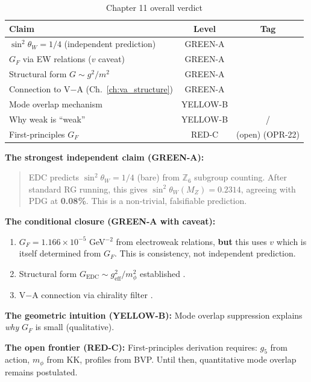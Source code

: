 \begin{table}[ht]
\centering
\caption{Chapter 11 overall verdict}
\label{tab:ch11_verdict}
\begin{tabular}{lcc}
\toprule
\textbf{Claim} & \textbf{Level} & \textbf{Tag} \\
\midrule
$\sin^2\theta_W = 1/4$ (independent prediction) & GREEN-A & \tagDer{} \\
$G_F$ via EW relations ($v$ caveat) & GREEN-A & \tagDc{} \\
Structural form $G \sim g^2/m^2$ & GREEN-A & \tagDc{} \\
Connection to V$-$A (Ch.~\ref{ch:va_structure}) & GREEN-A & \tagDc{} \\
\midrule
Mode overlap mechanism & YELLOW-B & \tagP{} \\
Why weak is ``weak'' & YELLOW-B & \tagP{}/\tagI{} \\
\midrule
First-principles $G_F$ & RED-C & (open) (OPR-22) \\
\bottomrule
\end{tabular}
\end{table}

\begin{tcolorbox}[colback=green!5, colframe=green!50!black,
    title=\textbf{Chapter 11 Summary}]
\textbf{The strongest independent claim (GREEN-A):}
\begin{quote}
EDC predicts $\sin^2\theta_W = 1/4$ (bare) from $\mathbb{Z}_6$ subgroup counting.
After standard RG running, this gives $\sin^2\theta_W(M_Z) = 0.2314$, agreeing
with PDG at \textbf{0.08\%}. This is a non-trivial, falsifiable prediction.
\end{quote}

\textbf{The conditional closure (GREEN-A with caveat):}
\begin{enumerate}[nosep]
    \item $G_F = 1.166 \times 10^{-5}$ GeV$^{-2}$ from electroweak relations,
          \textbf{but} this uses $v$ which is itself determined from $G_F$.
          This is consistency, not independent prediction.
    \item Structural form $G_{\text{EDC}} \sim g_{\text{eff}}^2/m_\phi^2$
          established \tagDc{}.
    \item V$-$A connection via chirality filter \tagDc{}.
\end{enumerate}

\textbf{The geometric intuition (YELLOW-B):}
Mode overlap suppression explains \emph{why} $G_F$ is small (qualitative).

\textbf{The open frontier (RED-C):}
First-principles derivation requires: $g_5$ from action, $m_\phi$ from KK,
profiles from BVP. Until then, quantitative mode overlap remains postulated.
\end{tcolorbox}

